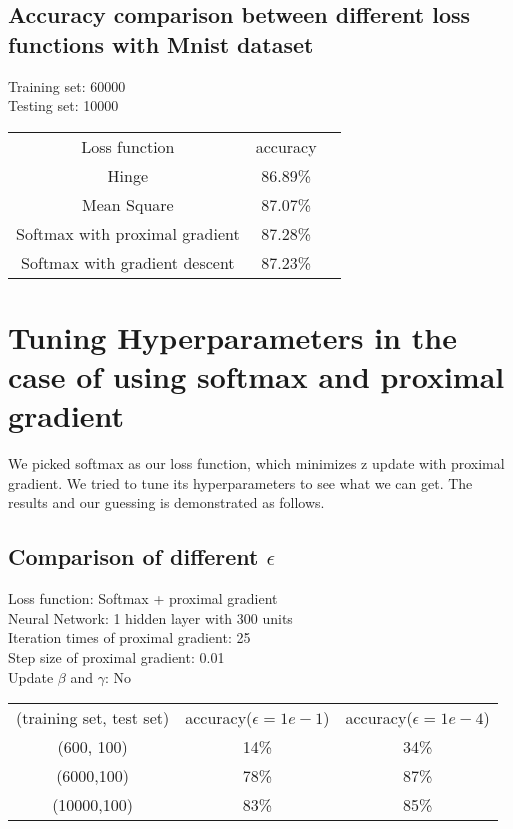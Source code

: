 \documentclass{article}
\begin{document}
\subsection{Accuracy comparison between different loss functions with Mnist dataset}
\begin{center}
Training set: 60000 \\
Testing set: 10000\\
\begin{tabular}{c c c}
	\hline
		Loss function & accuracy\\
		 Hinge& 86.89\%  \\
		 Mean Square& 87.07\% \\
		 Softmax with proximal gradient & 87.28\%  \\
		 Softmax with gradient descent  & 87.23\% \\ 
	\hline
	\end{tabular}
\end{center}

\section{Tuning Hyperparameters in the case of  using softmax and proximal gradient }
We picked softmax as our loss function, which minimizes z update with proximal gradient. We tried to tune its hyperparameters to see what we can get. The results and our guessing is demonstrated as follows.
\subsection{Comparison of different $\epsilon$}
\begin{center}
Loss function: Softmax + proximal gradient\\
Neural Network: 1 hidden layer with 300 units\\
Iteration times of proximal gradient: 25 \\
Step size of proximal gradient: 0.01 \\
Update $\beta$ and $\gamma$:  No\\
	\begin{tabular}{c c c}
	\hline
		(training set, test set) & accuracy($\epsilon=1e-1$) & accuracy($\epsilon=1e-4$)\\
		(600, 100) & 14\% & 34\% \\
		(6000,100) & 78\% & 87\% \\
		(10000,100) & 83\% & 85\% \\
	\hline
	\end{tabular}
\end{center}
\end{document}
